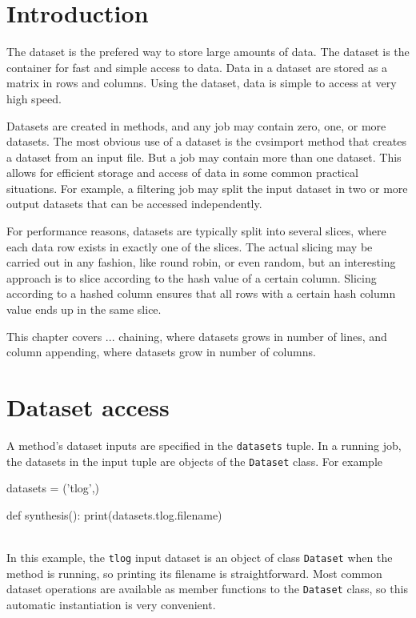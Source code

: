 \section{Introduction}

The dataset is the prefered way to store large amounts of data.  The
dataset is the container for fast and simple access to data.  Data in
a dataset are stored as a matrix in rows and columns.  Using the
dataset, data is simple to access at very high speed.

Datasets are created in methods, and any job may contain zero, one, or
more datasets.  The most obvious use of a dataset is the cvsimport
method that creates a dataset from an input file.  But a job may
contain more than one dataset.  This allows for efficient storage and
access of data in some common practical situations.  For example, a
filtering job may split the input dataset in two or more output
datasets that can be accessed independently.

For performance reasons, datasets are typically split into several
slices, where each data row exists in exactly one of the slices.  The
actual slicing may be carried out in any fashion, like round robin, or
even random, but an interesting approach is to slice according to the
hash value of a certain column.  Slicing according to a hashed column
ensures that all rows with a certain hash column value ends up in the
same slice.

This chapter covers ...
chaining, where datasets grows in number of lines, and column
appending, where datasets grow in number of columns.



\section{Dataset access}

A method's dataset inputs are specified in the \texttt{datasets}
tuple.  In a running job, the datasets in the input tuple are objects
of the \texttt{Dataset} class.  For example

\begin{python}
datasets = ('tlog',)

def synthesis():
  print(datasets.tlog.filename)
\end{python}
\\
In this example, the \texttt{tlog} input dataset is an object of class
\texttt{Dataset} when the method is running, so printing its filename
is straightforward.  Most common dataset operations are available as
member functions to the \texttt{Dataset} class, so this automatic
instantiation is very convenient.

